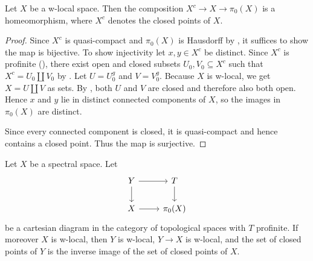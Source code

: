 \begin{lemma}
    \label{thm:closed-points-isom-pi0}
    Let \(X\) be a w-local space. Then the composition $X^c \to X \to \pi_0(X)$ is a homeomorphism,
    where $X^c$ denotes the closed points of $X$.
    \leanok
\end{lemma}

\begin{proof}
    Since $X^c$ is quasi-compact and $\pi_0(X)$ is Hausdorff by , it suffices
    to show the map is bijective.
    To show injectivity let $x, y \in X^c$ be distinct. Since $X^c$ is profinite
    (), there
    exist open and closed subsets $U_0, V_0 \subseteq X^c$ such that
    $X^c = U_0 \coprod V_0$ by .
    Let $U = U_0^g$ and $V = V_0^g$. Because $X$ is w-local, we get
    $X = U \coprod V$ as sets. By ,
    both $U$ and $V$ are closed and therefore also both open. Hence
    $x$ and $y$ lie in distinct connected components of $X$, so the images in $\pi_0(X)$ are distinct.

    Since every connected component is closed, it is quasi-compact and hence contains a closed point. Thus
    the map is surjective.
\end{proof}

\begin{lemma}
Let $X$ be a spectral space. Let
\[
\begin{tikzcd}
Y \arrow[r] \arrow[d] & T \arrow[d] \\
X \arrow[r] & \pi_0(X)
\end{tikzcd}
\]
be a cartesian diagram in the category of topological spaces with $T$ profinite. If moreover $X$ is w-local, then $Y$ is w-local, $Y \to X$ is w-local, and the set of closed points of $Y$ is the inverse image of the set of closed points of $X$.
\label{thm:cartesian-profinite-w-local}
\end{lemma}

